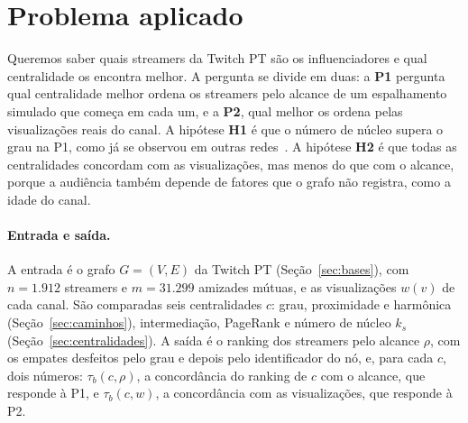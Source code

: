 \section{Problema aplicado}\label{sec:problema}

Queremos saber quais streamers da Twitch PT são os influenciadores e qual centralidade os encontra
melhor. A pergunta se divide em duas: a \textbf{P1} pergunta qual centralidade melhor ordena os
streamers pelo alcance de um espalhamento simulado que começa em cada um, e a \textbf{P2}, qual melhor
os ordena pelas visualizações reais do canal. A hipótese \textbf{H1} é que o número de núcleo supera
o grau na P1, como já se observou em outras redes~\cite{kitsak2010}. A hipótese \textbf{H2} é que
todas as centralidades concordam com as visualizações, mas menos do que com o alcance, porque a
audiência também depende de fatores que o grafo não registra, como a idade do canal.

\paragraph{Entrada e saída.} A entrada é o grafo $G = (V, E)$ da Twitch PT (Seção~\ref{sec:bases}),
com $n = 1.912$ streamers e $m = 31.299$ amizades mútuas, e as visualizações $w(v)$ de cada canal. São
comparadas seis centralidades $c$: grau, proximidade e harmônica (Seção~\ref{sec:caminhos}),
intermediação, PageRank e número de núcleo $k_s$ (Seção~\ref{sec:centralidades}). A saída é o
ranking dos streamers pelo alcance $\rho$, com os empates desfeitos pelo grau e depois pelo
identificador do nó, e, para cada $c$, dois números: $\tau_b(c, \rho)$, a concordância do ranking de
$c$ com o alcance, que responde à P1, e $\tau_b(c, w)$, a concordância com as visualizações, que
responde à P2.

